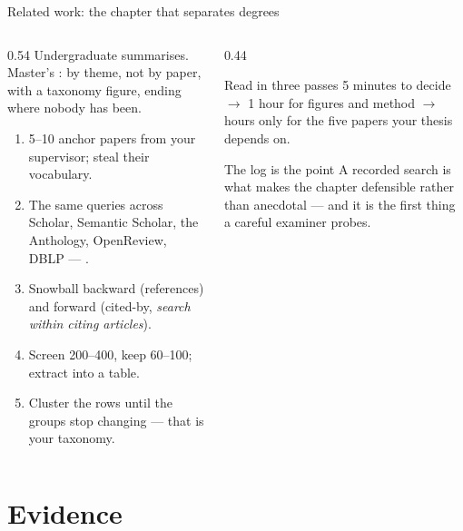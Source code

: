 \documentclass[aspectratio=169,11pt]{beamer}
\begin{document}
\begin{frame}{Related work: the chapter that separates degrees}
\begin{columns}[T]
\begin{column}{0.54\textwidth}
\footnotesize
Undergraduate summarises. Master's : by theme, not by paper,
with a taxonomy figure, ending where nobody has been.
\medskip
\begin{enumerate}
  \item 5--10 anchor papers from your supervisor; steal their vocabulary.
  \item The same queries across Scholar, Semantic Scholar, the Anthology,
        OpenReview, DBLP --- .
  \item Snowball backward (references) and forward (cited-by, \emph{search
        within citing articles}).
  \item Screen 200--400, keep 60--100; extract into a table.
  \item Cluster the rows until the groups stop changing --- that is your
        taxonomy.
\end{enumerate}
\end{column}
\begin{column}{0.44\textwidth}
\begin{block}{Read in three passes}
\footnotesize
5 minutes to decide $\rightarrow$ 1 hour for figures and method $\rightarrow$
hours only for the five papers your thesis depends on.
\end{block}
\begin{block}{The log is the point}
\footnotesize
A recorded search is what makes the chapter defensible rather than anecdotal
--- and it is the first thing a careful examiner probes.
\end{block}
\end{column}
\end{columns}
\end{frame}

\section{Evidence}
\end{document}
